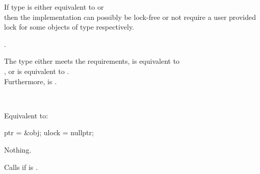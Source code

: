 \begin{itemdescr}
\begin{addedblock}
\pnum
\mandates If type  is either equivalent to  
or \\  then the implementation can possibly be
lock-free or not require a user provided lock for some objects of type  
respectively.
\end{addedblock}

\pnum
{}.
\begin{addedblock}
\expects The type  either meets the  requirements, 
 is equivalent to \\ , or
 is equivalent to .
\\ Furthermore,  is .
\end{addedblock}

\pnum
\effects {}\\
\begin{addedblock}Equivalent to:
\begin{codeblock}
  ptr = &obj;
  ulock = nullptr;
\end{codeblock}
\end{addedblock}

\pnum
\throws Nothing.
 
\pnum
\begin{addedblock}
\remarks Calls  if  is .
\end{addedblock}
\end{itemdescr}


